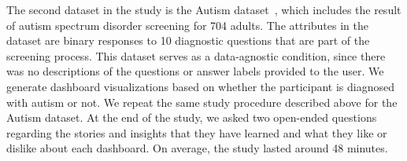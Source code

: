 \par The second dataset in the study is the Autism dataset~\cite{autism}, which includes the result of autism spectrum disorder screening for 704 adults. The attributes in the dataset are binary responses to 10 diagnostic questions that are part of the screening process. This dataset serves as a data-agnostic condition, since there was no descriptions of the questions or answer labels provided to the user. We generate dashboard visualizations based on whether the participant is diagnosed with autism or not. We repeat the same study procedure described above for the Autism dataset. At the end of the study, we asked two open-ended questions regarding the stories and insights that they have learned and what they like or dislike about each dashboard. On average, the study lasted around 48 minutes.
